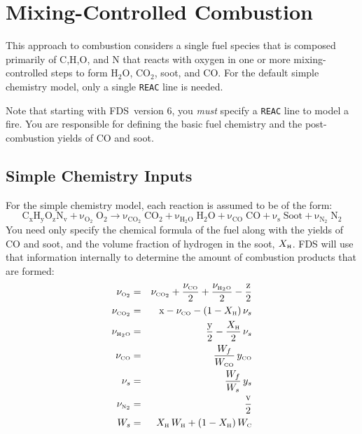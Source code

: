 \documentclass[11pt]{book}
\newcommand{\ct}{\tt\small}
\newcommand{\be}{\begin{equation}}
\newcommand{\ee}{\end{equation}}
\newcommand{\COTWO}{{\tiny \hbox{CO}_2}}
\newcommand{\HTWOO}{{\tiny \hbox{H}_2\hbox{O}}}
\newcommand{\OTWO}{{\tiny \hbox{O}_2}}
\newcommand{\NTWO}{{\tiny \hbox{N}_2}}
\newcommand{\CO}{{\tiny \hbox{CO}}}
\newcommand{\C}{{\tiny \hbox{C}}}
\newcommand{\Hy}{{\tiny \hbox{H}}}
\begin{document}
\section{Mixing-Controlled Combustion}


This approach to combustion considers a single fuel species that is composed primarily of C,H,O, and N that reacts with
oxygen in one or more mixing-controlled steps to form H$_2$O, CO$_2$, soot, and CO.
For the default simple chemistry model, only a single {\ct REAC} line is needed.

\begin{warning}
\noindent
Note that starting with FDS~version 6,
you {\em must} specify a {\ct REAC} line to model a fire.
You are responsible for defining the basic fuel chemistry and the post-combustion yields of CO and soot.
\end{warning}

\subsection{Simple Chemistry Inputs}
\label{info:simple_chemistry}

For the simple chemistry model, each reaction is assumed to be of the form:
\be \mathrm{C_xH_yO_zN_v + \nu_{O_2} \; O_2 \rightarrow
    \nu_{CO_2} \; CO_2 + \nu_{H_2O} \; H_2O +
    \nu_{CO}   \; CO   + \nu_s \; Soot + \nu_{N_2} \; N_2} \ee
You need only specify the chemical formula of the fuel along with
the yields of CO and soot, and the volume fraction of hydrogen in the soot, $X_\Hy$.
FDS will use that information internally to determine the amount of combustion products that are formed:
\begin{eqnarray*}
\nu_{\OTWO}    &=& \nu_{\COTWO} + \frac{\nu_{\CO}}{2} + \frac{\nu_{\HTWOO}}{2} - \frac{\hbox{z}}{2}   \\
\nu_{\COTWO}   &=& \hbox{x} - \nu_{\CO} - (1-X_\Hy) \, \nu_s \\
\nu_{\HTWOO}   &=& \frac{\hbox{y}}{2} - \frac{X_\Hy}{2} \, \nu_s \\
\nu_{\CO}      &=& \frac{W_f}{W_{\CO}} \, y_{\CO}  \\
\nu_s          &=& \frac{W_f}{W_s} \, y_s  \\
\nu_{\NTWO}    &=& \frac{\hbox{v}}{2}  \\
W_s            &=& X_\Hy \, W_\Hy + (1-X_\Hy) \, W_\C
\end{eqnarray*}
\end{document}
